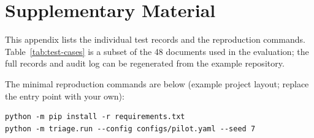 \section{Supplementary Material}
\label{app:cases}

This appendix lists the individual test records and the reproduction commands.
Table~\ref{tab:test-cases} is a subset of the 48 documents used in the evaluation; the full
records and audit log can be regenerated from the example repository.



The minimal reproduction commands are below (example project layout; replace the entry point
with your own):

\begin{verbatim}
python -m pip install -r requirements.txt
python -m triage.run --config configs/pilot.yaml --seed 7
\end{verbatim}

